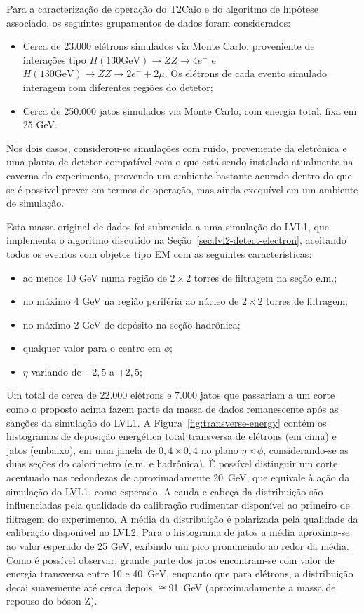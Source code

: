 Para a caracterização de operação do T2Calo e do algoritmo de hipótese
associado, os seguintes grupamentos de dados foram considerados:

\begin{itemize}
\item Cerca de 23.000 elétrons simulados via Monte Carlo, proveniente de
interações tipo $H (130 \text{GeV})\rightarrow ZZ \rightarrow 4e^-$ e 
$H (130 \text{GeV})\rightarrow ZZ \rightarrow 2e^- + 2\mu$. Os elétrons de
cada evento simulado interagem com diferentes regiões do detetor;
\item Cerca de 250.000 jatos simulados via Monte Carlo, com energia total,
fixa em 25 GeV. 
\end{itemize}

Nos dois casos, considerou-se simulações com ruído, proveniente da eletrônica
e uma planta de detetor compatível com o que está sendo instalado atualmente
na caverna do experimento, provendo um ambiente bastante acurado dentro do que
se é possível prever em termos de operação, mas ainda exequível em um ambiente
de simulação.

Esta massa original de dados foi submetida a uma simulação do LVL1, que
implementa o algoritmo discutido na Seção~\ref{sec:lvl2-detect-electron},
aceitando todos os eventos com objetos tipo EM com as seguintes
características:

\begin{itemize}
\item ao menos 10 GeV numa região de $2\times2$ torres de filtragem na seção
e.m.;
\item no máximo 4 GeV na região periféria ao núcleo de $2\times2$ torres de
filtragem; 
\item no máximo 2 GeV de depósito na seção hadrônica;
\item qualquer valor para o centro em $\phi$;
\item $\eta$ variando de $-2,5$ a $+2,5$;
\end{itemize}

Um total de cerca de 22.000 elétrons e 7.000 jatos que passariam a um corte
como o proposto acima fazem parte da massa de dados remanescente após as
sanções da simulação do LVL1. A Figura~\ref{fig:transverse-energy} contém os
histogramas de deposição energética total transversa de elétrons (em cima) e
jatos (embaixo), em uma janela de $0,4 \times 0,4$ no plano $\eta\times\phi$,
considerando-se as duas seções do calorímetro (e.m. e hadrônica). É possível
distinguir um corte acentuado nas redondezas de aproximadamente 20~GeV, que
equivale à ação da simulação do LVL1, como esperado. A cauda e cabeça da
distribuição são influenciadas pela qualidade da calibração rudimentar
disponível ao primeiro de filtragem do experimento. A média da distribuição é
polarizada pela qualidade da calibração disponível no LVL2. Para o histograma
de jatos a média aproxima-se ao valor esperado de 25 GeV, exibindo um pico
pronunciado ao redor da média. Como é possível observar, grande parte dos jatos
encontram-se com valor de energia transversa entre 10 e 40~GeV, enquanto que
para elétrons, a distribuição decai suavemente até cerca depois $\cong$91~GeV
(aproximadamente a massa de repouso do bóson Z).

